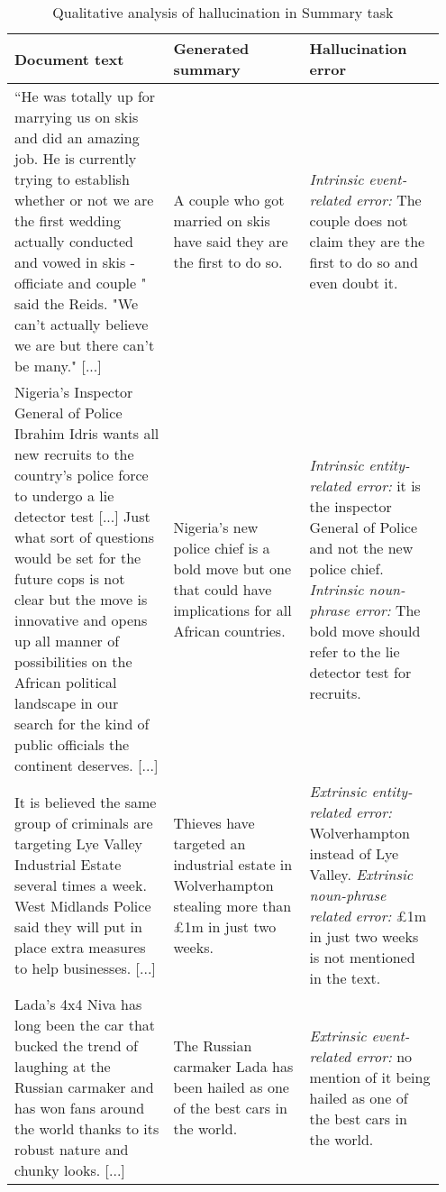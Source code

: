\begin{table}[!htbp]
\small
\begin{tabular}{p{0.35\linewidth} p{0.3\linewidth}   p{0.3\linewidth} }
\hline
\textbf{Document text} & \textbf{Generated summary} & \textbf{Hallucination error} \\
\hline
 [...] ``He was totally up for marrying us on skis and did an amazing job. He is currently trying to establish whether or not we are the first wedding actually conducted and vowed in skis - officiate and couple " said the Reids. "We can't actually believe we are but there can't be many." [...] &  A couple who got married on skis have said they are the first to do so. & \textit{Intrinsic event-related error:} The couple does not claim they are the first to do so and even doubt it. \\
 \hline
 \hline
[...] Nigeria's Inspector General of Police  Ibrahim Idris  wants all new recruits to the country's police force to undergo a lie detector test [...] Just what sort of questions would be set for the future cops is not clear  but the move is innovative and opens up all manner of possibilities on the African political landscape in our search for the kind of public officials the continent deserves. [...]    & Nigeria's new police chief is a bold move  but one that could have implications for all African countries. 
& \textit{Intrinsic entity-related error:}  it is the inspector General of Police and not the new police chief. \newline \newline \textit{Intrinsic noun-phrase error:} The bold move should refer to the lie detector test for recruits. \\
 \hline
 \hline
 It is believed the same group of criminals are targeting Lye Valley Industrial Estate several times a week. West Midlands Police said they will put in place extra measures to help businesses. [...]    & Thieves have targeted an industrial estate in Wolverhampton  stealing more than £1m in just two weeks. & \textit{Extrinsic entity-related error:} Wolverhampton instead of Lye Valley. \newline \newline \textit{Extrinsic noun-phrase related} \textit{error:} £1m in just two weeks is not mentioned in the text. \\
 \hline
 \hline
[...] Lada's 4x4 Niva has long been the car that bucked the trend of laughing at the Russian carmaker and has won fans around the world thanks to its robust nature and chunky looks. [...] & The Russian carmaker Lada has been hailed as one of the best cars in the world. & \textit{Extrinsic event-related error:}  no mention of it being hailed as one of the best cars in the world. \\

\end{tabular}
\caption{Qualitative analysis of hallucination in Summary task}
\label{tab:characterise_hallucinations}
\end{table}
